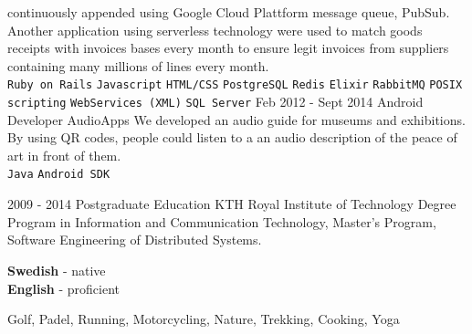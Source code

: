 \documentclass[9pt]{template} %
\begin{document}
\begin{entrylist}
{      continuously appended using Google Cloud Plattform message queue, PubSub.\\
      Another application using serverless technology were used to match goods
      receipts with invoices bases every month to ensure legit invoices from
      suppliers containing many millions of lines every month.\\
      \texttt{Ruby on Rails}\slashsep
      \texttt{Javascript}\slashsep
      \texttt{HTML/CSS}\slashsep
      \texttt{PostgreSQL}\slashsep
      \texttt{Redis}\slashsep
      \texttt{Elixir}\slashsep
      \texttt{RabbitMQ}\slashsep
      \texttt{POSIX scripting}\slashsep
      \texttt{WebServices (XML)}\slashsep
      \texttt{SQL Server}
    }
  \entry
    {Feb 2012 - Sept 2014}
    {Android Developer}
    {AudioApps}
    {We developed an audio guide for museums and exhibitions. By using QR codes,
      people could listen to a an audio description of the peace of art in front
      of them.\\
      \texttt{Java}\slashsep
      \texttt{Android SDK}
    }
\end{entrylist}

\pagebreak



\begin{entrylist}
  \entry
    {2009 - 2014}
    {Postgraduate Education}
    {KTH Royal Institute of Technology}
    {Degree Program in Information and Communication Technology, Master's
      Program, Software Engineering of Distributed Systems.}
\end{entrylist}


\begin{minipage}[t]{0.3\textwidth}
  \vspace{-\baselineskip} %


  \textbf{Swedish} - native\\
  \textbf{English} - proficient
\end{minipage}
\hfill
\begin{minipage}[t]{0.7\textwidth}
  \vspace{-\baselineskip} %


  Golf, Padel, Running, Motorcycling, Nature, Trekking, Cooking, Yoga
\end{minipage}
\end{document}
